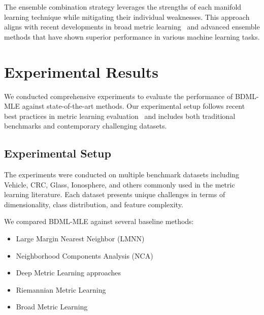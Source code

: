 \documentclass[review]{elsarticle}
\begin{document}
The ensemble combination strategy leverages the strengths of each manifold learning technique while mitigating their individual weaknesses. This approach aligns with recent developments in broad metric learning~\cite{bs2025distance} and advanced ensemble methods that have shown superior performance in various machine learning tasks.

\section{Experimental Results}

We conducted comprehensive experiments to evaluate the performance of BDML-MLE against state-of-the-art methods. Our experimental setup follows recent best practices in metric learning evaluation~\cite{gruffaz2025riemannian} and includes both traditional benchmarks and contemporary challenging datasets.

\subsection{Experimental Setup}

The experiments were conducted on multiple benchmark datasets including Vehicle, CRC, Glass, Ionosphere, and others commonly used in the metric learning literature. Each dataset presents unique challenges in terms of dimensionality, class distribution, and feature complexity.

We compared BDML-MLE against several baseline methods:
\begin{itemize}
\item Large Margin Nearest Neighbor (LMNN)~\cite{weinberger2009distance}
\item Neighborhood Components Analysis (NCA)~\cite{goldberger2005neighbourhood}
\item Deep Metric Learning approaches~\cite{xu2025deep}
\item Riemannian Metric Learning~\cite{gruffaz2025riemannian}
\item Broad Metric Learning~\cite{hu2025broad}
\end{itemize}
\end{document}
